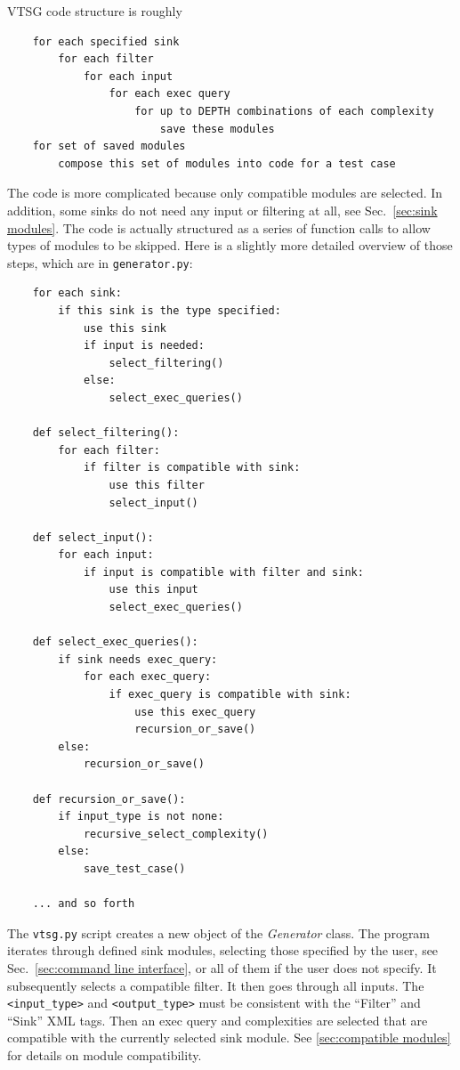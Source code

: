 \documentclass[12pt]{article}
\begin{document}
VTSG code structure is roughly
\begin{verbatim}
    for each specified sink
        for each filter
            for each input
                for each exec query
                    for up to DEPTH combinations of each complexity
                        save these modules
    for set of saved modules
        compose this set of modules into code for a test case
\end{verbatim}
The code is more complicated because only compatible modules are 
selected.
In addition, some sinks do not need any input or filtering at all,
see Sec.~\ref{sec:sink modules}.
The code is actually structured as a series of function calls to allow types
of modules to be skipped.  Here is a slightly more detailed
overview of those steps, which are in \verb|generator.py|:
\begin{verbatim}
    for each sink:
        if this sink is the type specified:
            use this sink
            if input is needed:
                select_filtering()
            else:
                select_exec_queries()
    
    def select_filtering():
        for each filter:
            if filter is compatible with sink:
                use this filter
                select_input()
    
    def select_input():
        for each input:
            if input is compatible with filter and sink:
                use this input
                select_exec_queries()

    def select_exec_queries():
        if sink needs exec_query:
            for each exec_query:
                if exec_query is compatible with sink:
                    use this exec_query
                    recursion_or_save()
        else:
            recursion_or_save()

    def recursion_or_save():
        if input_type is not none:
            recursive_select_complexity()
        else:
            save_test_case()

    ... and so forth
\end{verbatim}

The \verb|vtsg.py| script creates a new object of the
\emph{Generator} class. 
The program iterates through defined sink modules, selecting those
specified by the user, see
Sec.~\ref{sec:command line interface}, 
or all of them if the user does not specify. It subsequently
selects a compatible filter.  It then goes through all inputs.
The \verb|<input_type>| and \verb|<output_type>|
must be consistent with the ``Filter'' and ``Sink'' XML tags.
Then an exec query and complexities are selected
that are compatible with the currently selected sink module.
See \ref{sec:compatible modules} for details on module compatibility.
\end{document}
